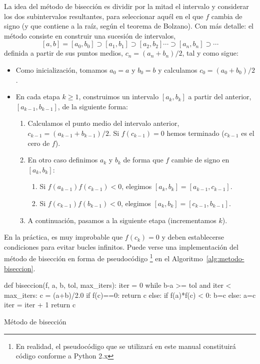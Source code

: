 La idea del método de bisección es dividir por la mitad el intervalo y
considerar los dos subintervalos resultantes, para seleccionar aquél
en el que $f$ cambia de signo (y que contiene a la raíz, según el
teorema de Bolzano). Con más detalle: el método consiste en construir
una sucesión de intervalos,
\begin{equation}
\label{eq:tema1:bisecc:0}
[a,b]=[a_0,b_0] \supset [a_1,b_1] \supset [a_2,b_2] \cdots \supset
[a_n,b_n] \supset \cdots
\end{equation}
definida a partir de sus puntos medios, $c_n=(a_n+b_n)/2$, tal y como sigue:
\begin{itemize}
\item Como inicialización, tomamos $a_0=a$ y $b_0=b$ y calculamos
  $c_0=(a_0+b_0)/2$.
\item En cada etapa $k\ge 1$, construimos un intervalo $[a_k,b_k]$ a
  partir del anterior, $[a_{k-1}, b_{k-1}]$, de la siguiente forma:
  \begin{enumerate}
  \item Calculamos el punto medio del intervalo anterior,
    $c_{k-1}=(a_{k-1}+b_{k-1})/2$. Si $f(c_{k-1})=0$ hemos terminado
    ($c_{k-1}$ es el cero de $f$).
  \item En otro caso definimos $a_k$ y $b_k$ de forma que $f$ cambie de
    signo en $[a_k,b_k]$:
    \begin{enumerate}
    \item Si $f(a_{k-1})f(c_{k-1})<0$, elegimos $[a_k,b_k]=[a_{k-1}, c_{k-1}]$.
    \item Si $f(c_{k-1})f(b_{k-1})<0$, elegimos $[a_k,b_k]=[c_{k-1}, b_{k-1}]$.
    \end{enumerate}
  \item A continuación, pasamos a la siguiente etapa (incrementamos
    $k$).
  \end{enumerate}
\end{itemize}

En la práctica, es muy improbable que $f(c_k)=0$ y deben establecerse
condiciones para evitar bucles infinitos. Puede verse una
implementación del método de bisección en forma de
pseudocódigo%
\footnote{En realidad, el pseudocódigo que se utilizará en
  este manual constituirá código conforme a Python 2.x} en el
Algoritmo~\ref{alg:metodo-biseccion}.
\begin{algorithm}  \begin{python}
def biseccion(f, a, b, tol, max_iters):
  iter = 0
  while b-a >= tol and iter < max_iters:
      c = (a+b)/2.0
      if f(c)==0:   
          return c
      else:
          if f(a)*f(c) < 0:
              b=c
          else:
              a=c
      iter = iter + 1
  return c    
\end{python}
\caption{Método de bisección}
\label{alg:metodo-biseccion}
\end{algorithm}

